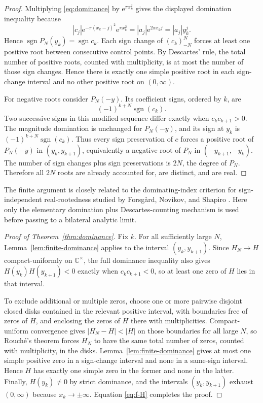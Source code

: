 \documentclass[11pt]{article}
\newcommand{\C}{\mathbb{C}}
\newcommand{\e}{\mathrm{e}}
\newcommand{\sgn}{\operatorname{sgn}}
\begin{document}
\begin{proof}
Multiplying \eqref{eq:dominance} by $\e^{\pi x_k^2}$ gives the displayed domination inequality because
\[
 |c_j|\e^{-\pi(x_k-j)^2}\e^{\pi x_k^2}
 =|a_j|\e^{2\pi x_kj}=|a_j|y_k^j.
\]
Hence $\sgn P_N(y_k)=\sgn c_k$. Each sign change of $(c_k)_{-N}^{N}$ forces at least one positive root between consecutive control points. By Descartes' rule, the total number of positive roots, counted with multiplicity, is at most the number of those sign changes. Hence there is exactly one simple positive root in each sign-change interval and no other positive root on $(0,\infty)$.

For negative roots consider $P_N(-y)$. Its coefficient signs, ordered by $k$, are
\[
 (-1)^{k+N}\sgn(c_k).
\]
Two successive signs in this modified sequence differ exactly when $c_kc_{k+1}>0$. The magnitude domination is unchanged for $P_N(-y)$, and its sign at $y_k$ is $(-1)^{k+N}\sgn(c_k)$. Thus every sign preservation of $c$ forces a positive root of $P_N(-y)$ in $(y_k,y_{k+1})$, equivalently a negative root of $P_N$ in $(-y_{k+1},-y_k)$. The number of sign changes plus sign preservations is $2N$, the degree of $P_N$. Therefore all $2N$ roots are already accounted for, are distinct, and are real.
\end{proof}

The finite argument is closely related to the dominating-index criterion for sign-independent real-rootedness studied by Forsg\aa rd, Novikov, and Shapiro \cite{Forsgard2017}. Here only the elementary domination plus Descartes-counting mechanism is used before passing to a bilateral analytic limit.

\begin{proof}[Proof of Theorem~\ref{thm:dominance}]
Fix $k$. For all sufficiently large $N$, Lemma~\ref{lem:finite-dominance} applies to the interval $(y_k,y_{k+1})$. Since $H_N\to H$ compact-uniformly on $\C^\times$, the full dominance inequality also gives $H(y_k)H(y_{k+1})<0$ exactly when $c_kc_{k+1}<0$, so at least one zero of $H$ lies in that interval.

To exclude additional or multiple zeros, choose one or more pairwise disjoint closed disks contained in the relevant positive interval, with boundaries free of zeros of $H$, and enclosing the zeros of $H$ there with multiplicities. Compact-uniform convergence gives $|H_N-H|<|H|$ on those boundaries for all large $N$, so Rouch\'e's theorem forces $H_N$ to have the same total number of zeros, counted with multiplicity, in the disks. Lemma~\ref{lem:finite-dominance} gives at most one simple positive zero in a sign-change interval and none in a same-sign interval. Hence $H$ has exactly one simple zero in the former and none in the latter. Finally, $H(y_k)\neq0$ by strict dominance, and the intervals $(y_k,y_{k+1})$ exhaust $(0,\infty)$ because $x_k\to\pm\infty$. Equation \eqref{eq:f-H} completes the proof.
\end{proof}
\end{document}
